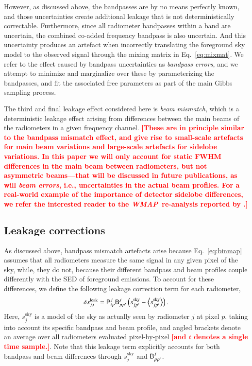 \documentclass[twocolumn]{aa}
\def\WMAP{\textit{WMAP}}
\newcommand{\B}[0]{\tens{B}}
\renewcommand{\P}[0]{\tens{P}}
\newcommand{\?}[1]{\textcolor{red}{{\bf [#1]}}}
\begin{document}
However, as discussed above, the bandpasses are by no means perfectly
known, and those uncertainties create additional leakage that is not
deterministically correctable.  Furthermore, since all radiometer
bandpasses within a band are uncertain, the combined co-added
frequency bandpass is also uncertain. And this uncertainty produces an
artefact when incorrectly translating the foreground sky model to the
observed signal through the mixing matrix in Eq.~\eqref{eq:mixmat}. We
refer to the effect caused by bandpass uncertainties as
\textit{bandpass errors}, and we attempt to minimize and marginalize
over these by parameterizing the bandpasses, and fit the associated
free parameters as part of the main Gibbs sampling process.

The third and final leakage effect considered here is \textit{beam
  mismatch}, which is a deterministic leakage effect arising from
differences between the main beams of the radiometers in a given
frequency channel. \?{\textbf{These are in principle similar to the
    bandpass mismatch effect, and give rise to small-scale artefacts
    for main beam variations and large-scale artefacts for sidelobe
    variations. In this paper we will only account for static FWHM
    differences in the main beam between radiometers, but not
    asymmetric beams---that will be discussed in future publications,
    as will \emph{beam errors}, i.e., uncertainties in the actual beam
    profiles. For a real-world example of the importance of detector
    sidelobe differences, we refer the interested reader to the
    \WMAP\ re-analysis reported by \citet{bp17}.}}

\subsection{Leakage corrections}
\label{sec:leakcorr}

As discussed above, bandpass mismatch artefacts arise because
Eq.~\eqref{eq:binmap} assumes that all radiometers measure the same signal in
any given pixel of the sky, while, they do not, because their different bandpass
and beam profiles couple differently with the SED of foreground emissions. To
account for these differences, we define the following leakage correction term
for each radiometer,
\begin{equation}
  \delta s^{\mathrm{leak}}_{j, t} = \P^{j}_{tp}\B_{pp'}^j\left(s^{\mathrm{sky}}_{jp'} - \left<s^{\mathrm{sky}}_{jp'}\right>\right).
 \label{eq:leak}
\end{equation}
Here, $s^{\mathrm{sky}}_{j}$ is a model of the sky as actually seen by
radiometer $j$ at pixel $p$, taking into account its specific bandpass and beam
profile, and angled brackets denote an average over all radiometers
evaluated pixel-by-pixel \?{\textbf{and $t$ denotes a single time sample.}}. Note that this leakage term explicitly
accounts for both bandpass and beam differences through
$s^{\mathrm{sky}}_{j}$ and $\B_{pp'}^j$.
\end{document}
